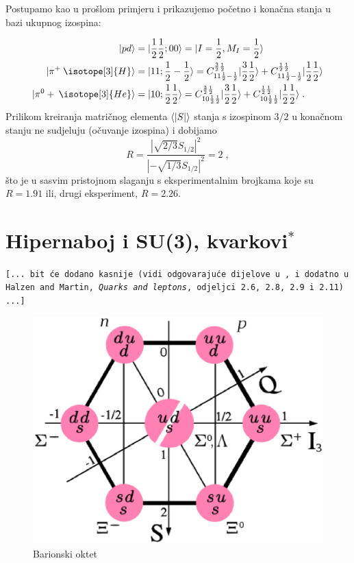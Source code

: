 Postupamo kao u prošlom primjeru i prikazujemo početno i konačna
stanja u bazi ukupnog izospina:

\begin{align}
\ket{p d} &= \ket{\fhalf \fhalf ; 0 0} = \ket{I=\fhalf, M_I = \fhalf} \\
\ket{\pi^+ \:\isotope[3]{H}} &= \ket{1 1; \fhalf -\fhalf} = 
  C^{\frac{3}{2} \fhalf}_{1 1 \fhalf -\fhalf} \ket{\frac{3}{2} \fhalf} +
  C^{\frac{1}{2} \fhalf}_{1 1 \fhalf -\fhalf} \ket{\frac{1}{2} \fhalf} \\
\ket{\pi^0 + \:\isotope[3]{He}} &= \ket{1 0; \fhalf \fhalf} = 
  C^{\frac{3}{2} \fhalf}_{1 0 \fhalf \fhalf} \ket{\frac{3}{2} \fhalf} +
  C^{\frac{1}{2} \fhalf}_{1 0 \fhalf \fhalf} \ket{\frac{1}{2} \fhalf}  \;.
\end{align}
Prilikom kreiranja matričnog elementa $\langle  |S|  \rangle$ stanja s izospinom
$3/2$ u konačnom stanju ne sudjeluju (očuvanje izospina) i dobijamo
\begin{equation}
 R = \frac{|\sqrt{2/3} S_{1/2}|^2}{|-\sqrt{1/3} S_{1/2}|^2} = 2 \;,
\end{equation}
što je u sasvim pristojnom slaganju s eksperimentalnim brojkama
koje su $R=1.91$ ili, drugi eksperiment, $R=2.26$.

\section{Hipernaboj i SU(3), kvarkovi$^*$}

\texttt{[... bit će dodano kasnije (vidi odgovarajuće dijelove u \cite{Jones:1998},
i dodatno u Halzen and Martin, \emph{Quarks and leptons}, odjeljci 2.6, 2.8, 2.9 i 2.11) ...]}

\begin{figure}[ht]
\begin{center}
\includegraphics[scale=0.4]{pics/baryon_octet}
\end{center}
\caption{Barionski oktet}
\label{fig:baryon_octet}
\end{figure}

